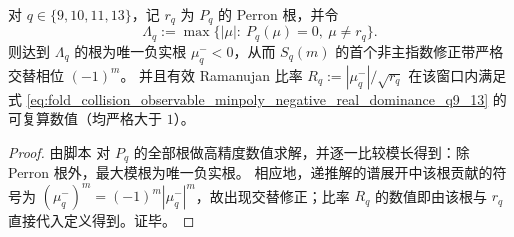 \begin{proposition}[负实主导律与交替修正：\texorpdfstring{$q=9,10,11,13$}{q=9,10,11,13} 的有效 Ramanujan 比率]\label{prop:pom-observable-minpoly-negative-real-dominance-q9-13}
对 \(q\in\{9,10,11,13\}\)，记 \(r_q\) 为 \(P_q\) 的 Perron 根，并令
\[
\Lambda_q:=\max\{|\mu|:\ P_q(\mu)=0,\ \mu\neq r_q\}.
\]
则达到 \(\Lambda_q\) 的根为唯一负实根 \(\mu^-_q<0\)，从而 \(S_q(m)\) 的首个非主指数修正带严格交替相位 \(({-1})^m\)。
并且有效 Ramanujan 比率
\(
R_q:=|\mu^-_q|/\sqrt{r_q}
\)
在该窗口内满足式 \eqref{eq:fold_collision_observable_minpoly_negative_real_dominance_q9_13} 的可复算数值（均严格大于 \(1\)）。
\end{proposition}
\begin{proof}
由脚本  对 \(P_q\) 的全部根做高精度数值求解，并逐一比较模长得到：除 Perron 根外，最大模根为唯一负实根。
相应地，递推解的谱展开中该根贡献的符号为 \((\mu^-_q)^m=(-1)^m|\mu^-_q|^m\)，故出现交替修正；比率 \(R_q\) 的数值即由该根与 \(r_q\) 直接代入定义得到。证毕。
\end{proof}


